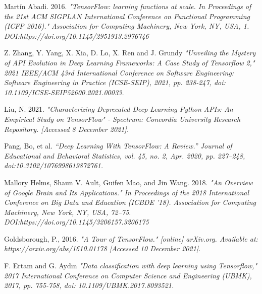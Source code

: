 \documentclass[12pt,letterpaper]{report}
\begin{document}
\begin{thebibliography}{9}

    Martín Abadi. 2016.
    \textit{ "TensorFlow: learning functions at scale. In Proceedings of the 21st ACM SIGPLAN International Conference on Functional Programming (ICFP 2016)." Association for Computing Machinery, New York, NY, USA, 1. DOI:https://doi.org/10.1145/2951913.2976746}
    
    Z. Zhang, Y. Yang, X. Xia, D. Lo, X. Ren and J. Grundy
    \textit{"Unveiling the Mystery of API Evolution in Deep Learning Frameworks: A Case Study of Tensorflow 2," 2021 IEEE/ACM 43rd International Conference on Software Engineering: Software Engineering in Practice (ICSE-SEIP), 2021, pp. 238-247, doi: 10.1109/ICSE-SEIP52600.2021.00033.}
    
    Liu, N. 2021.
    \textit{"Characterizing Deprecated Deep Learning Python APIs: An Empirical Study on TensorFlow" - Spectrum: Concordia University Research Repository. [Accessed 8 December 2021].}

    Pang, Bo, et al.
    \textit{“Deep Learning With TensorFlow: A Review.” 
    Journal of Educational and Behavioral Statistics, vol. 45, no. 2, 
    Apr. 2020, pp. 227–248, doi:10.3102/1076998619872761.}

    Mallory Helms, Shaun V. Ault, Guifen Mao, and Jin Wang. 2018.
    \textit{"An Overview of Google Brain and Its Applications." In Proceedings of the 2018 International Conference on Big Data and Education (ICBDE '18). Association for Computing Machinery, New York, NY, USA, 72–75. DOI:https://doi.org/10.1145/3206157.3206175}
    
    Goldsborough, P., 2016.
    \textit{"A Tour of TensorFlow." [online] arXiv.org. Available at: https://arxiv.org/abs/1610.01178 [Accessed 10 December 2021].}
    
    F. Ertam and G. Aydın
    \textit{"Data classification with deep learning using Tensorflow," 2017 International Conference on Computer Science and Engineering (UBMK), 2017, pp. 755-758, doi: 10.1109/UBMK.2017.8093521.}
    
\end{thebibliography}
\end{document}
